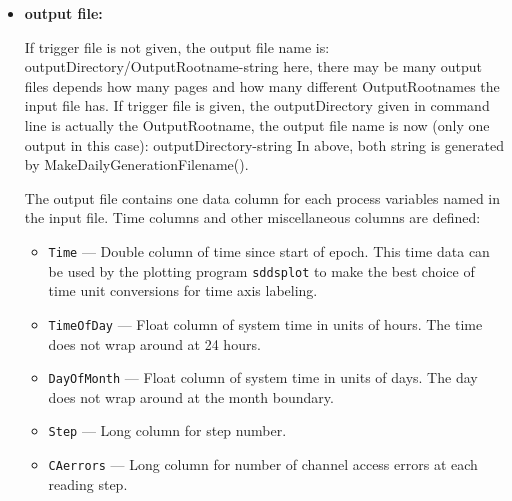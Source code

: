 \begin{itemize}
\begin{itemize}
\item {\bf output file:}\par
If trigger file is not given, the output file name is:
   outputDirectory/OutputRootname-string
   here, there may be many output files depends how many pages and how many different OutputRootnames 
   the input file has.
If trigger file is given, the outputDirectory given in command line is actually the OutputRootname,
the output file name is now (only one output in this case):
   outputDirectory-string
In above, both string is generated by MakeDailyGenerationFilename().

The output file contains one data column for each process variables named in the input file. 
Time columns and other miscellaneous columns are defined: 
\begin{itemize}
        \item {\tt Time} --- Double column of time since start of epoch. This time data can be used by
        the plotting program {\verb+sddsplot+} to make the best choice of time unit conversions
        for time axis labeling.
        \item {\tt TimeOfDay} --- Float column of system time in units of hours. 
        The time does not wrap around at 24 hours.
        \item {\tt DayOfMonth} --- Float column of system time in units of days. 
        The day does not wrap around at the month boundary.
        \item {\tt Step} --- Long column for step number.
        \item {\tt CAerrors} --- Long column for number of channel access errors at each reading step. 
\end{itemize}


\end{itemize}
\end{itemize}
